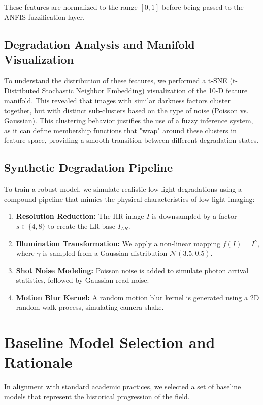 These features are normalized to the range $[0, 1]$ before being passed to the ANFIS fuzzification layer.

\subsection{Degradation Analysis and Manifold Visualization}
To understand the distribution of these features, we performed a t-SNE (t-Distributed Stochastic Neighbor Embedding) visualization of the 10-D feature manifold. This revealed that images with similar darkness factors cluster together, but with distinct sub-clusters based on the type of noise (Poisson vs. Gaussian). This clustering behavior justifies the use of a fuzzy inference system, as it can define membership functions that "wrap" around these clusters in feature space, providing a smooth transition between different degradation states.

\subsection{Synthetic Degradation Pipeline}
To train a robust model, we simulate realistic low-light degradations using a compound pipeline that mimics the physical characteristics of low-light imaging:
\begin{enumerate}
    \item \textbf{Resolution Reduction:} The HR image $I$ is downsampled by a factor $s \in \{4, 8\}$ to create the LR base $I_{LR}$.
    \item \textbf{Illumination Transformation:} We apply a non-linear mapping $f(I) = I^\gamma$, where $\gamma$ is sampled from a Gaussian distribution $\mathcal{N}(3.5, 0.5)$.
    \item \textbf{Shot Noise Modeling:} Poisson noise is added to simulate photon arrival statistics, followed by Gaussian read noise.
    \item \textbf{Motion Blur Kernel:} A random motion blur kernel is generated using a 2D random walk process, simulating camera shake.
\end{enumerate}

\section{Baseline Model Selection and Rationale}
In alignment with standard academic practices, we selected a set of baseline models that represent the historical progression of the field.

